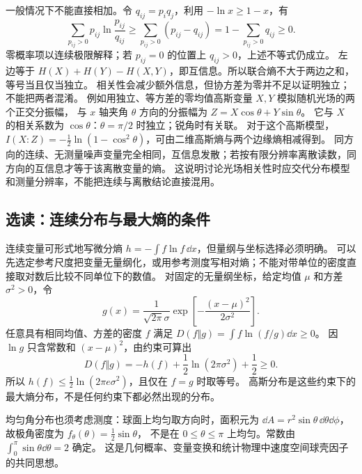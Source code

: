 一般情况下不能直接相加。令 $q_{ij}=p_iq_j$，利用 $-\ln x\ge1-x$，有
\[\sum_{p_{ij}>0}p_{ij}\ln\frac{p_{ij}}{q_{ij}}
\ge\sum_{p_{ij}>0}(p_{ij}-q_{ij})
=1-\sum_{p_{ij}>0}q_{ij}\ge0.\]
零概率项以连续极限解释；若 $p_{ij}=0$ 的位置上 $q_{ij}>0$，上述不等式仍成立。
左边等于 $H(X)+H(Y)-H(X,Y)$，即互信息。所以联合熵不大于两边之和，等号当且仅当独立。
相关性会减少额外信息，但协方差为零并不足以证明独立；不能把两者混淆。
例如用独立、等方差的零均值高斯变量 $X,Y$ 模拟随机光场的两个正交分振幅，
与 $x$ 轴夹角 $\theta$ 方向的分振幅为 $Z=X\cos\theta+Y\sin\theta$。
它与 $X$ 的相关系数为 $\cos\theta$：$\theta=\pi/2$ 时独立；锐角时有关联。
对于这个高斯模型，$I(X{:}Z)=-\tfrac12\ln(1-\cos^2\theta)$，可由二维高斯熵与两个边缘熵相减得到。
同方向的连续、无测量噪声变量完全相同，互信息发散；若按有限分辨率离散读数，同方向的互信息才等于该离散变量的熵。
这说明讨论光场相关性时应交代分布模型和测量分辨率，不能把连续与离散结论直接混用。

\subsection{选读：连续分布与最大熵的条件}

连续变量可形式地写微分熵 $h=-\int f\ln f\,\dd x$，但量纲与坐标选择必须明确。
可以先选定参考尺度把变量无量纲化，或用参考测度写相对熵；不能对带单位的密度直接取对数后比较不同单位下的数值。
对固定的无量纲坐标，给定均值 $\mu$ 和方差 $\sigma^2>0$，令
\[g(x)=\frac1{\sqrt{2\pi}\sigma}\exp\!\left[-\frac{(x-\mu)^2}{2\sigma^2}\right].\]
任意具有相同均值、方差的密度 $f$ 满足 $D(f\Vert g)=\int f\ln(f/g)\dd x\ge0$。
因 $\ln g$ 只含常数和 $(x-\mu)^2$，由约束可算出
\[D(f\Vert g)=-h(f)+\frac12\ln(2\pi\sigma^2)+\frac12\ge0.\]
所以 $h(f)\le\tfrac12\ln(2\pi e\sigma^2)$，且仅在 $f=g$ 时取等号。
高斯分布是这些约束下的最大熵分布，不是任何约束下都必然出现的分布。

均匀角分布也须考虑测度：球面上均匀取方向时，面积元为
$\dd A=r^2\sin\theta\,\dd\theta\dd\phi$，故极角密度为 $f_\theta(\theta)=\tfrac12\sin\theta$，
不是在 $0\le\theta\le\pi$ 上均匀。常数由 $\int_0^\pi\sin\theta\dd\theta=2$ 确定。
这是几何概率、变量变换和统计物理中速度空间球壳因子的共同思想。


